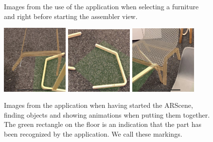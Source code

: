 \begin{figure}[!hbtp]
\begin{center}
\caption{Images from the use of the application when selecting a furniture and right before starting the assembler view.}
\label{fig:applicationSelection}
\end{center}
\end{figure}

\begin{figure}[!hbtp]
\begin{center}
\includegraphics[width = 0.3\textwidth]{./Images/Application4}
\includegraphics[width = 0.3\textwidth]{./Images/Application5}
\includegraphics[width = 0.3\textwidth]{./Images/Application6}
\caption{Images from the application when having started the ARScene, finding objects and showing animations when putting them together. The green rectangle on the floor is an indication that the part has been recognized by the application. We call these markings.}
\label{fig:applicationAssembler}
\end{center}
\end{figure}

\newpage